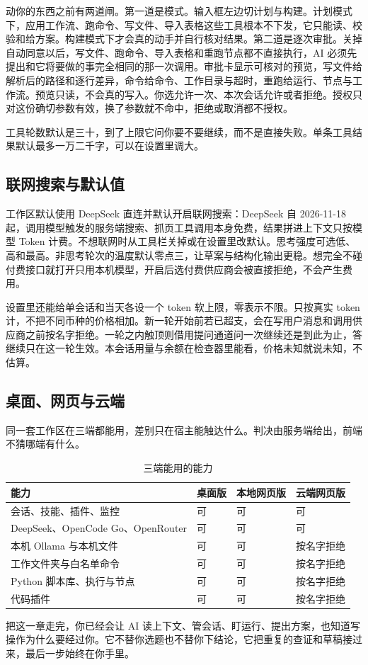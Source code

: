 动你的东西之前有两道闸。第一道是模式。输入框左边切计划与构建。计划模式下，应用工作流、跑命令、写文件、导入表格这些工具根本不下发，它只能读、校验和给方案。构建模式下才会真的动手并自行核对结果。第二道是逐次审批。关掉自动同意以后，写文件、跑命令、导入表格和重跑节点都不直接执行，AI 必须先提出和它将要做的事完全相同的那一次调用。审批卡显示可核对的预览，写文件给解析后的路径和逐行差异，命令给命令、工作目录与超时，重跑给运行、节点与工作流。预览只读，不会真的写入。你选允许一次、本次会话允许或者拒绝。授权只对这份确切参数有效，换了参数就不命中，拒绝或取消都不授权。

工具轮数默认是三十，到了上限它问你要不要继续，而不是直接失败。单条工具结果默认最多一万二千字，可以在设置里调大。

\subsection{联网搜索与默认值}

工作区默认使用 DeepSeek 直连并默认开启联网搜索：DeepSeek 自 2026-11-18 起，调用模型触发的服务端搜索、抓页工具调用本身免费，结果拼进上下文只按模型 Token 计费。不想联网时从工具栏关掉或在设置里改默认。思考强度可选低、高和最高。非思考轮次的温度默认零点三，让草案与结构化输出更稳。想完全不碰付费接口就打开只用本机模型，开启后选付费供应商会被直接拒绝，不会产生费用。

设置里还能给单会话和当天各设一个 token 软上限，零表示不限。只按真实 token 计，不把不同币种的价格相加。新一轮开始前若已超支，会在写用户消息和调用供应商之前按名字拒绝。一轮之内触顶则借用提问通道问一次继续还是到此为止，答继续只在这一轮生效。本会话用量与余额在检查器里能看，价格未知就说未知，不估算。

\subsection{桌面、网页与云端}

同一套工作区在三端都能用，差别只在宿主能触达什么。判决由服务端给出，前端不猜哪端有什么。

\begin{table}[H]\centering
\caption{三端能用的能力}
\label{tab:ai-hosts}
\small
\begin{tabularx}{\textwidth}{p{4.0cm}XXX}
\toprule
能力 & 桌面版 & 本地网页版 & 云端网页版 \\
\midrule
会话、技能、插件、监控 & 可 & 可 & 可 \\
DeepSeek、OpenCode Go、OpenRouter & 可 & 可 & 可 \\
本机 Ollama 与本机文件 & 可 & 可 & 按名字拒绝 \\
工作文件夹与白名单命令 & 可 & 可 & 按名字拒绝 \\
Python 脚本库、执行与节点 & 可 & 可 & 按名字拒绝 \\
代码插件 & 可 & 可 & 按名字拒绝 \\
\bottomrule
\end{tabularx}
\end{table}

把这一章走完，你已经会让 AI 读上下文、管会话、盯运行、提出方案，也知道写操作为什么要经过你。它不替你选题也不替你下结论，它把重复的查证和草稿接过来，最后一步始终在你手里。
